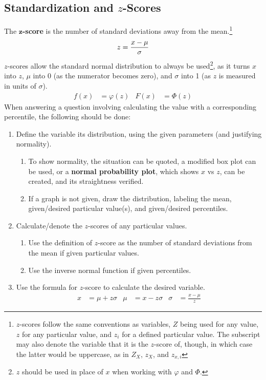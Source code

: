 \documentclass[../AP_Statistics.tex]{subfiles}
\begin{document}
			\subsection*{Standardization and $z$-Scores}
				The $\pmb{z}$\textbf{-score} is the number of standard deviations away from the mean.\footnote{$z$-scores follow the same conventions as variables, $Z$ being used for any value, $z$ for any particular value, and $z_i$ for a defined particular value. The subscript may also denote the variable that it is the $z$-score of, though, in which case the latter would be uppercase, as in $Z_X$, $z_X$, and $z_{x,i}$}
				$$z = \frac{x - \mu}{\sigma}$$
				$z$-scores allow the standard normal distribution to always be used\footnote{$z$ should be used in place of $x$ when working with $\varphi$ and $\Phi$.}, as it turns $x$ into $z$, $\mu$ into 0 (as the numerator becomes zero), and $\sigma$ into 1 (as $z$ is measured in units of $\sigma$).
				\begin{align*}
					f(x) &= \varphi(z) & F(x) &= \Phi(z)
				\end{align*}
				When answering a question involving calculating the value with a corresponding percentile, the following should be done:
				\begin{enumerate}
					\item Define the variable its distribution, using the given parameters (and justifying normality).
					\begin{enumerate}
						\item To show normality, the situation can be quoted, a modified box plot can be used, or a \textbf{normal probability plot}, which shows $x$ vs $z$, can be created, and its straightness verified.
						\item If a graph is not given, draw the distribution, labeling the mean, given/desired particular value(s), and given/desired percentiles.
					\end{enumerate}
					\item Calculate/denote the $z$-scores of any particular values.
					\begin{enumerate}
						\item Use the definition of $z$-score as the number of standard deviations from the mean if given particular values.
						\item Use the inverse normal function if given percentiles.
					\end{enumerate}
					\item Use the formula for $z$-score to calculate the desired variable.
						\begin{align*}
							x &= \mu + z\sigma & \mu &= x - z\sigma & \sigma &= \frac{x - \mu}{z}
						\end{align*}
				\end{enumerate}
\end{document}
